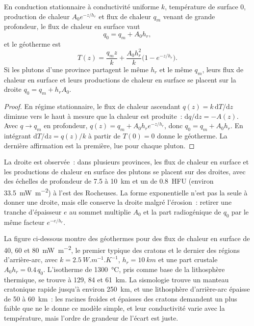 \begin{proposition}\label{prop:b3:lithosphere-thermal-models:exponential}
En conduction stationnaire à conductivité uniforme $k$, température de surface $0$,
production de chaleur $A_0e^{-z/h_r}$ et flux de chaleur $q_m$ venant de grande profondeur, le
flux de chaleur en surface vaut
\[
  q_0 = q_m + A_0h_r,
\]
et le géotherme est
\[
  T(z) = \frac{q_mz}{k} + \frac{A_0h_r^2}{k}\bigl(1 - e^{-z/h_r}\bigr).
\]
Si les plutons d'une province partagent le même $h_r$ et le même $q_m$, leurs
flux de chaleur en surface et leurs productions de chaleur en surface se placent sur la droite
$q_0 = q_m + h_rA_0$.
\end{proposition}

\begin{proof}
En régime stationnaire, le flux de chaleur ascendant $q(z) = k\,\mathrm dT/\mathrm dz$ diminue
vers le haut à mesure que la chaleur est produite~: $\mathrm dq/\mathrm dz = -A(z)$. Avec $q \to q_m$
en profondeur, $q(z) = q_m + A_0h_re^{-z/h_r}$, donc $q_0 = q_m + A_0h_r$. En intégrant
$\mathrm dT/\mathrm dz = q(z)/k$ à partir de $T(0) = 0$ donne le géotherme. La dernière
affirmation est la première, lue pour chaque pluton.
\end{proof}

La droite est observée~: dans plusieurs provinces, les flux de chaleur en surface et les
productions de chaleur en surface des plutons se placent sur des droites, avec des échelles de profondeur de 7.5 à
\qty{10}{km} et un  de \qty{0.8}{HFU} (environ
\qty{33.5}{mW.m^{-2}}) à l'est des Rocheuses. La forme exponentielle n'est pas
la seule à donner une droite, mais elle conserve la droite malgré l'érosion~: retirer une tranche
d'épaisseur $e$ au sommet multiplie $A_0$ et la part radiogénique de $q_0$ par le même facteur $e^{-e/h_r}$.

La figure ci-dessous montre des géothermes pour des flux de chaleur en surface de 40, 60 et
\qty{80}{mW.m^{-2}}, le premier typique des cratons et le dernier des
régions d'arrière-arc, avec $k = \qty{2.5}{W.m^{-1}.K^{-1}}$, $h_r = \qty{10}{km}$ et une part
crustale $A_0h_r = 0.4\,q_0$. L'isotherme de \qty{1300}{\celsius}, pris comme
base de la lithosphère thermique, se trouve à 129, 84 et \qty{61}{km}.
La sismologie trouve un manteau cratonique rapide jusqu'à environ \qty{250}{km}, et une
lithosphère d'arrière-arc épaisse de 50 à \qty{60}{km}~: les racines froides et épaisses des cratons
demandent un  plus faible que ne le donne ce modèle simple, et leur
conductivité varie avec la température, mais l'ordre de grandeur de l'écart est juste.


